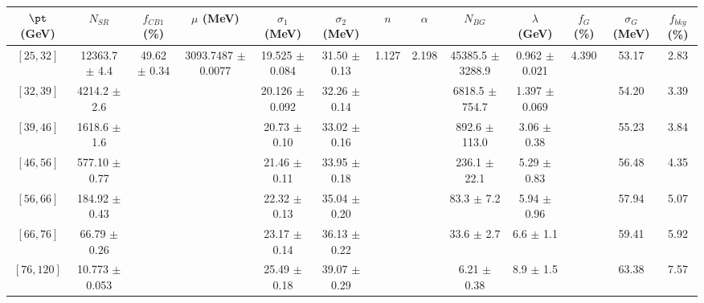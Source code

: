 \begin{tabular}{c||c|c|c|c|c|c|c|c|c|c|c||c}
$\pt$ (GeV) & $N_{SR}$ & $f_{CB1}$ (\%) & $\mu$ (MeV) & $\sigma_1$ (MeV) & $\sigma_2$ (MeV) & $n$ & $\alpha$ & $N_{BG}$ & $\lambda$ (GeV) & $f_G$ (\%) & $\sigma_G$ (MeV) & $f_{bkg}$ (\%) \\
\hline
$[25, 32]$ & 12363.7 $\pm$ 4.4 & \multirow{7}{*}{49.62 $\pm$ 0.34} & \multirow{7}{*}{3093.7487 $\pm$ 0.0077} & 19.525 $\pm$ 0.084 & 31.50 $\pm$ 0.13 & \multirow{7}{*}{1.127} & \multirow{7}{*}{2.198} & 45385.5 $\pm$ 3288.9 & 0.962 $\pm$ 0.021 & \multirow{7}{*}{4.390} & 53.17 & 2.83\\
$[32, 39]$ & 4214.2 $\pm$ 2.6 &  &  & 20.126 $\pm$ 0.092 & 32.26 $\pm$ 0.14 &  &  & 6818.5 $\pm$ 754.7 & 1.397 $\pm$ 0.069 &  & 54.20 & 3.39\\
$[39, 46]$ & 1618.6 $\pm$ 1.6 &  &  & 20.73 $\pm$ 0.10 & 33.02 $\pm$ 0.16 &  &  & 892.6 $\pm$ 113.0 & 3.06 $\pm$ 0.38 &  & 55.23 & 3.84\\
$[46, 56]$ & 577.10 $\pm$ 0.77 &  &  & 21.46 $\pm$ 0.11 & 33.95 $\pm$ 0.18 &  &  & 236.1 $\pm$ 22.1 & 5.29 $\pm$ 0.83 &  & 56.48 & 4.35\\
$[56, 66]$ & 184.92 $\pm$ 0.43 &  &  & 22.32 $\pm$ 0.13 & 35.04 $\pm$ 0.20 &  &  & 83.3 $\pm$ 7.2 & 5.94 $\pm$ 0.96 &  & 57.94 & 5.07\\
$[66, 76]$ & 66.79 $\pm$ 0.26 &  &  & 23.17 $\pm$ 0.14 & 36.13 $\pm$ 0.22 &  &  & 33.6 $\pm$ 2.7 & 6.6 $\pm$ 1.1 &  & 59.41 & 5.92\\
$[76, 120]$ & 10.773 $\pm$ 0.053 &  &  & 25.49 $\pm$ 0.18 & 39.07 $\pm$ 0.29 &  &  & 6.21 $\pm$ 0.38 & 8.9 $\pm$ 1.5 &  & 63.38 & 7.57\\
\end{tabular}
